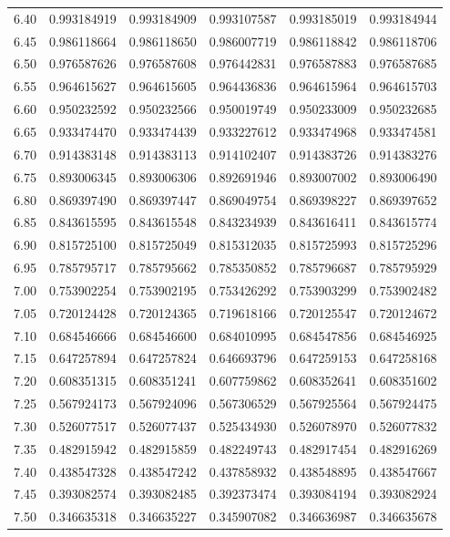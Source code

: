 \documentclass[11pt,a4paper]{article}
\begin{document}
\begin{longtable}{rrrrrr}
6.40 & 0.993184919 & 0.993184909 & 0.993107587 & 0.993185019 & 0.993184944 \\
6.45 & 0.986118664 & 0.986118650 & 0.986007719 & 0.986118842 & 0.986118706 \\
6.50 & 0.976587626 & 0.976587608 & 0.976442831 & 0.976587883 & 0.976587685 \\
6.55 & 0.964615627 & 0.964615605 & 0.964436836 & 0.964615964 & 0.964615703 \\
6.60 & 0.950232592 & 0.950232566 & 0.950019749 & 0.950233009 & 0.950232685 \\
6.65 & 0.933474470 & 0.933474439 & 0.933227612 & 0.933474968 & 0.933474581 \\
6.70 & 0.914383148 & 0.914383113 & 0.914102407 & 0.914383726 & 0.914383276 \\
6.75 & 0.893006345 & 0.893006306 & 0.892691946 & 0.893007002 & 0.893006490 \\
6.80 & 0.869397490 & 0.869397447 & 0.869049754 & 0.869398227 & 0.869397652 \\
6.85 & 0.843615595 & 0.843615548 & 0.843234939 & 0.843616411 & 0.843615774 \\
6.90 & 0.815725100 & 0.815725049 & 0.815312035 & 0.815725993 & 0.815725296 \\
6.95 & 0.785795717 & 0.785795662 & 0.785350852 & 0.785796687 & 0.785795929 \\
7.00 & 0.753902254 & 0.753902195 & 0.753426292 & 0.753903299 & 0.753902482 \\
7.05 & 0.720124428 & 0.720124365 & 0.719618166 & 0.720125547 & 0.720124672 \\
7.10 & 0.684546666 & 0.684546600 & 0.684010995 & 0.684547856 & 0.684546925 \\
7.15 & 0.647257894 & 0.647257824 & 0.646693796 & 0.647259153 & 0.647258168 \\
7.20 & 0.608351315 & 0.608351241 & 0.607759862 & 0.608352641 & 0.608351602 \\
7.25 & 0.567924173 & 0.567924096 & 0.567306529 & 0.567925564 & 0.567924475 \\
7.30 & 0.526077517 & 0.526077437 & 0.525434930 & 0.526078970 & 0.526077832 \\
7.35 & 0.482915942 & 0.482915859 & 0.482249743 & 0.482917454 & 0.482916269 \\
7.40 & 0.438547328 & 0.438547242 & 0.437858932 & 0.438548895 & 0.438547667 \\
7.45 & 0.393082574 & 0.393082485 & 0.392373474 & 0.393084194 & 0.393082924 \\
7.50 & 0.346635318 & 0.346635227 & 0.345907082 & 0.346636987 & 0.346635678 \\

\end{longtable}
\end{document}
